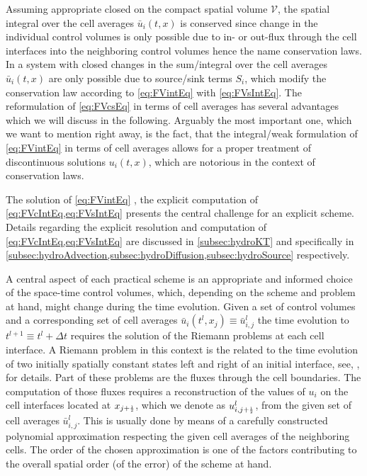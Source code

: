 Assuming appropriate closed \bcs{} on the compact spatial volume $\mathcal{V}$, the spatial integral over the cell averages $\bar{u}_{i} ( t, x )$ is conserved since change in the individual control volumes is only possible due to in- or out-flux through the cell interfaces into the neighboring control volumes \dash{} hence the name conservation laws.
In a system with closed \bcs{} changes in the sum/integral over the cell averages $\bar{u}_{i} ( t, x )$ are only possible due to source/sink terms $S_i$, which modify the conservation law according to \cref{eq:FVintEq} with \cref{eq:FVsIntEq}.
The reformulation of \cref{eq:FVcsEq} in terms of cell averages has several advantages which we will discuss in the following.
Arguably the most important one, which we want to mention right away, is the fact, that the integral/weak formulation of \cref{eq:FVintEq} in terms of cell averages allows for a proper treatment of discontinuous solutions $u_{i} ( t, x )$, which are notorious in the context of conservation laws.\bigskip

The solution of \cref{eq:FVintEq} \dash{} \ie{}, the explicit computation of \cref{eq:FVcIntEq,eq:FVsIntEq} \dash{} presents the central challenge for an explicit \fv{} scheme.
Details regarding the explicit resolution and computation of \cref{eq:FVcIntEq,eq:FVsIntEq} are discussed in \cref{subsec:hydroKT} and specifically in \cref{subsec:hydroAdvection,subsec:hydroDiffusion,subsec:hydroSource} respectively.

A central aspect of each practical \fv{} scheme is an appropriate and informed choice of the space-time control volumes, which, depending on the scheme and problem at hand, might change during the time evolution. 
Given a set of control volumes and a corresponding set of cell averages $\bar{u}_i ( t^l, x_j ) \equiv \bar{u}^l_{i,j}$ the time evolution to ${t^{l+1}\equiv t^l+\Delta t}$ requires the solution of the Riemann problems at each cell interface.
A Riemann problem in this \cfd{} context is the \ivp{} related to the time evolution of two initially spatially constant states left and right of an initial interface, see, \eg{},  for details.
Part of these problems are the fluxes through the cell boundaries.
The computation of those fluxes requires a reconstruction of the values of $u_i$ on the cell interfaces located at $x_{j + \ttfrac{1}{2}}$, which we denote as $u_{i,j + \ttfrac{1}{2}}^l$, from the given set of cell averages $\bar{u}_{i,j}^l$.
This is usually done by means of a carefully constructed polynomial approximation respecting the given cell averages of the neighboring cells.
The order of the chosen approximation is one of the factors contributing to the overall spatial order (of the error) of the scheme at hand.

